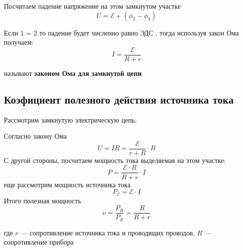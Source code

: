 \documentclass[../main.tex]{subfiles}
\begin{document}
Посчитаем падение напряжение на этом замкнутом участке
\[U = \mathscr{E} + (\phi_2 - \phi_1)\]

 Если 1 = 2 то падение будет численно равно ЭДС , тогда используя закон Ома получаем:
\[I = \frac{\mathscr{E}}{R + r}\]
\begin{center}
    называют \textbf{законом Ома для замкнутой цепи}    
\end{center}


\subsection{Коэфициент полезного действия источника тока}
Рассмотрим замкнутую электрическую цепь:

\begin{center}


\end{center}

Согласно закону Ома 
\[ U = IR = \frac{\mathscr{E}}{r+R} \cdot R \]
С другой стороны, посчитаем мощность тока выделяемая на этом участке:
\[P = \frac{\mathscr{E} \cdot R}{R+r} \cdot I\]
еще рассмотрим мощность источника тока
\[P_{\mathscr{E}} = \mathscr{E} \cdot I\]
Итого полезная мощность
\[\nu = \frac{P_R}{P_E} = \frac{R}{R+r}\]
\begin{center}
    где $r$ --- сопротивление источника тока и проводящих проводов, $R$ --- сопротивление прибора 
\end{center}
\end{document}
